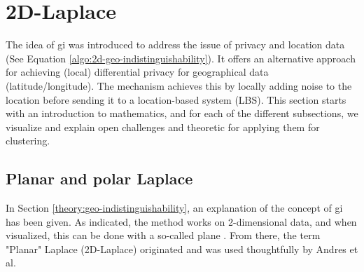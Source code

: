 %
\section{2D-Laplace}
The idea of \gls{gi} was introduced to address the issue of privacy and location data \citep{DBLP:journals/corr/abs-1212-1984} (See Equation \ref{algo:2d-geo-indistinguishability}).
It offers an alternative approach for achieving (local) differential privacy for geographical data (latitude/longitude).
The mechanism achieves this by locally adding noise to the location before sending it to a location-based system (LBS).
This section starts with an introduction to mathematics, and for each of the different subsections, we visualize and explain open challenges and theoretic for applying them for clustering.
\subsection{Planar and polar Laplace}
In Section \ref{theory:geo-indistinguishability}, an explanation of the concept of \gls{gi} has been given.
As indicated, the method works on 2-dimensional data, and when visualized, this can be done with a so-called plane \citep{DBLP:journals/corr/abs-1212-1984}.
From there, the term "Planar" Laplace (2D-Laplace) originated and was used thoughtfully by Andres et al.

